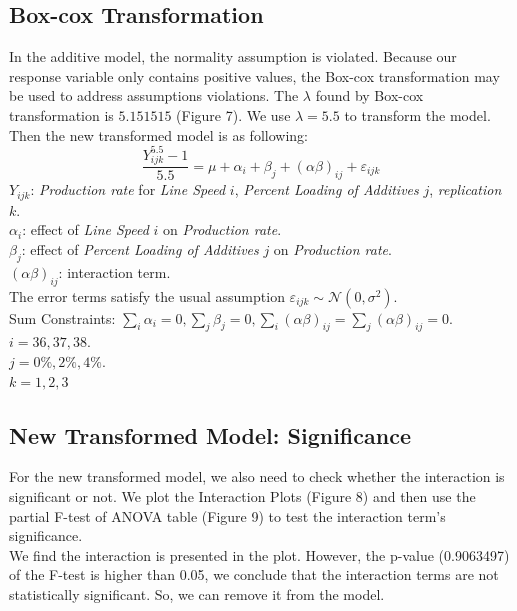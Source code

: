 \documentclass[11pt,a4paper]{article}
\begin{document}
\subsection{Box-cox Transformation}
In the additive model, the normality assumption is violated. Because our response variable only contains positive values, the Box-cox transformation may be used to address assumptions violations. The $\lambda$ found by Box-cox transformation is $5.151515$ (Figure 7). We use $\lambda=5.5$ to transform the model. Then the new transformed model is as following:
$$\frac{Y_{ijk}^{5.5}-1}{5.5}=\mu+\alpha_i+\beta_j+(\alpha\beta)_{ij}+\varepsilon_{ijk}$$
$Y_{ijk}$: \textit{Production rate} for \textit{Line Speed} $i$, \textit{Percent Loading of Additives} $j$, \textit{replication} $k$.\\
$\alpha_i$: effect of \textit{Line Speed} $i$ on \textit{Production rate}.\\
$\beta_j$: effect of \textit{Percent Loading of Additives} $j$ on \textit{Production rate}.\\
$(\alpha\beta)_{ij}$: interaction term.\\
The error terms satisfy the usual assumption $\varepsilon_{i j k} \sim \mathcal{N}\left(0, \sigma^{2}\right)$.\\
Sum Constraints: $\sum_{i} \alpha_{i}=0, \sum_{j} \beta_{j}=0, \sum_{i}(\alpha \beta)_{i j}=\sum_{j}(\alpha \beta)_{i j}=0$.\\
$i=36,37,38.$\\
$j=0\%,2\%,4\%.$\\
$k=1,2,3$


\subsection{New Transformed Model: Significance}
For the new transformed model, we also need to check whether the interaction is significant or not. We plot the Interaction Plots (Figure 8) and then use the partial F-test of ANOVA table (Figure 9) to test the interaction term's significance.\\
We find the interaction is presented in the plot. However, the p-value (0.9063497) of the F-test is higher than 0.05, we conclude that the interaction terms are not statistically significant. So, we can remove it from the model.\\
\end{document}

